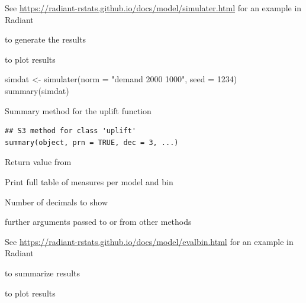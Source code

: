 \documentclass[a4paper]{book}
\begin{document}
%
\begin{Details}
See \url{https://radiant-rstats.github.io/docs/model/simulater.html} for an example in Radiant
\end{Details}
%
\begin{SeeAlso}
 to generate the results

 to plot results
\end{SeeAlso}
%
\begin{Examples}
\begin{ExampleCode}
simdat <- simulater(norm = "demand 2000 1000", seed = 1234)
summary(simdat)

\end{ExampleCode}
\end{Examples}
%
\begin{Description}
Summary method for the uplift function
\end{Description}
%
\begin{Usage}
\begin{verbatim}
## S3 method for class 'uplift'
summary(object, prn = TRUE, dec = 3, ...)
\end{verbatim}
\end{Usage}
%
\begin{Arguments}
\begin{ldescription}
\item[\code{object}] Return value from 

\item[\code{prn}] Print full table of measures per model and bin

\item[\code{dec}] Number of decimals to show

\item[\code{...}] further arguments passed to or from other methods
\end{ldescription}
\end{Arguments}
%
\begin{Details}
See \url{https://radiant-rstats.github.io/docs/model/evalbin.html} for an example in Radiant
\end{Details}
%
\begin{SeeAlso}
 to summarize results

 to plot results
\end{SeeAlso}
\end{document}
